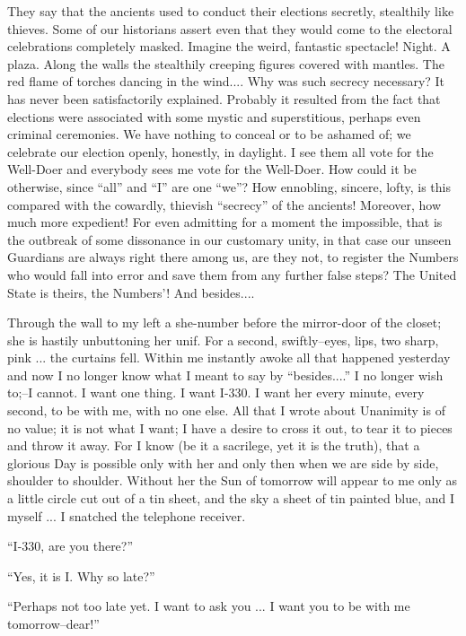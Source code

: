 \documentclass[11pt,openany]{book}
\begin{document}
They say that the ancients used to conduct their elections secretly, stealthily like thieves. Some of our historians assert even that they would come to the electoral celebrations completely masked. Imagine the weird, fantastic spectacle! Night. A plaza. Along the walls the stealthily creeping figures covered with mantles. The red flame of torches dancing in the wind.... Why was such secrecy necessary? It has never been satisfactorily explained. Probably it resulted from the fact that elections were associated with some mystic and superstitious, perhaps even criminal ceremonies. We have nothing to conceal or to be ashamed of; we celebrate our election openly, honestly, in daylight. I see them all vote for the Well-Doer and everybody sees me vote for the Well-Doer. How could it be otherwise, since ``all'' and ``I'' are one ``we''? How ennobling, sincere, lofty, is this compared with the cowardly, thievish ``secrecy'' of the ancients! Moreover, how much more expedient! For even admitting for a moment the impossible, that is the outbreak of some dissonance in our customary unity, in that case our unseen Guardians are always right there among us, are they not, to register the Numbers who would fall into error and save them from any further false steps? The United State is theirs, the Numbers'! And besides....

Through the wall to my left a she-number before the mirror-door of the closet; she is hastily unbuttoning her unif. For a second, swiftly--eyes, lips, two sharp, pink ... the curtains fell. Within me instantly awoke all that happened yesterday and now I no longer know what I meant to say by ``besides....'' I no longer wish to;--I cannot. I want one thing. I want I-330. I want her every minute, every second, to be with me, with no one else. All that I wrote about Unanimity is of no value; it is not what I want; I have a desire to cross it out, to tear it to pieces and throw it away. For I know (be it a sacrilege, yet it is the truth), that a glorious Day is possible only with her and only then when we are side by side, shoulder to shoulder. Without her the Sun of tomorrow will appear to me only as a little circle cut out of a tin sheet, and the sky a sheet of tin painted blue, and I myself ... I snatched the telephone receiver.

``I-330, are you there?''

``Yes, it is I. Why so late?''

``Perhaps not too late yet. I want to ask you ... I want you to be with me tomorrow--dear!''
\end{document}
